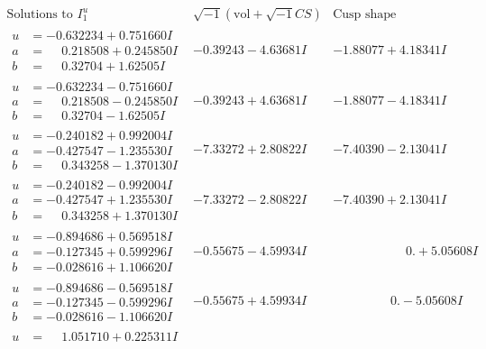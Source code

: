 \documentclass[1p]{elsarticle_modified}
\theoremstyle{definition}
\newcommand{\I}{\sqrt{-1}}
\begin{document}
$$\begin{array}{c|c|c}  
\text{Solutions to }I^u_{1}& \I (\text{vol} + \sqrt{-1}CS) & \text{Cusp shape}\\
 \hline 
\begin{aligned}
u &= -0.632234 + 0.751660 I \\
a &= \phantom{-}0.218508 + 0.245850 I \\
b &= \phantom{-}0.32704 + 1.62505 I\end{aligned}
 & -0.39243 - 4.63681 I & -1.88077 + 4.18341 I \\ \hline\begin{aligned}
u &= -0.632234 - 0.751660 I \\
a &= \phantom{-}0.218508 - 0.245850 I \\
b &= \phantom{-}0.32704 - 1.62505 I\end{aligned}
 & -0.39243 + 4.63681 I & -1.88077 - 4.18341 I \\ \hline\begin{aligned}
u &= -0.240182 + 0.992004 I \\
a &= -0.427547 - 1.235530 I \\
b &= \phantom{-}0.343258 - 1.370130 I\end{aligned}
 & -7.33272 + 2.80822 I & -7.40390 - 2.13041 I \\ \hline\begin{aligned}
u &= -0.240182 - 0.992004 I \\
a &= -0.427547 + 1.235530 I \\
b &= \phantom{-}0.343258 + 1.370130 I\end{aligned}
 & -7.33272 - 2.80822 I & -7.40390 + 2.13041 I \\ \hline\begin{aligned}
u &= -0.894686 + 0.569518 I \\
a &= -0.127345 + 0.599296 I \\
b &= -0.028616 + 1.106620 I\end{aligned}
 & -0.55675 - 4.59934 I & \phantom{-0.000000 -}0. + 5.05608 I \\ \hline\begin{aligned}
u &= -0.894686 - 0.569518 I \\
a &= -0.127345 - 0.599296 I \\
b &= -0.028616 - 1.106620 I\end{aligned}
 & -0.55675 + 4.59934 I & \phantom{-0.000000 } 0. - 5.05608 I \\ \hline\begin{aligned}
u &= \phantom{-}1.051710 + 0.225311 I \\

\end{aligned}
\end{array}$$
\end{document}
